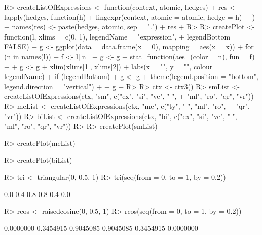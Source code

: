 \documentclass{article}\usepackage[]{graphicx}\usepackage[]{color}
\begin{document}
\begin{Schunk}
\begin{Sinput}
R> createListOfExpressions <- function(context, atomic, hedges) {
+      res <- lapply(hedges, function(h) {
+          lingexpr(context, atomic = atomic, hedge = h)
+      })
+      names(res) <- paste(hedges, atomic, sep = ".")
+      res
+  }
R> 
R> createPlot <- function(l, xlims = c(0, 1), legendName = "expression", 
+      legendBottom = FALSE) {
+      g <- ggplot(data = data.frame(x = 0), mapping = aes(x = x))
+      for (n in names(l)) {
+          f <- l[[n]]
+          g <- g + stat_function(aes_(color = n), fun = f)
+      }
+      g <- g + xlim(xlims[1], xlims[2]) + labs(x = "", y = "", colour = legendName)
+      if (legendBottom) {
+          g <- g + theme(legend.position = "bottom", legend.direction = "vertical")
+      }
+      g
+  }
R> 
R> ctx <- ctx3()
R> smList <- createListOfExpressions(ctx, "sm", c("ex", "si", "ve", "-", 
+      "ml", "ro", "qr", "vr"))
R> meList <- createListOfExpressions(ctx, "me", c("ty", "-", "ml", "ro", 
+      "qr", "vr"))
R> biList <- createListOfExpressions(ctx, "bi", c("ex", "si", "ve", "-", 
+      "ml", "ro", "qr", "vr"))
R> 
R> createPlot(smList)
\end{Sinput}
\end{Schunk}

\begin{Schunk}
\begin{Sinput}
R> createPlot(meList)
\end{Sinput}
\end{Schunk}

\begin{Schunk}
\begin{Sinput}
R> createPlot(biList)
\end{Sinput}
\end{Schunk}

\begin{Schunk}
% --begin: "triangular"
\begin{Sinput}
R> tri <- triangular(0, 0.5, 1)
R> tri(seq(from = 0, to = 1, by = 0.2))
\end{Sinput}
\begin{Soutput}
[1] 0.0 0.4 0.8 0.8 0.4 0.0
\end{Soutput}
\begin{Sinput}
R> rcos <- raisedcosine(0, 0.5, 1)
R> rcos(seq(from = 0, to = 1, by = 0.2))
\end{Sinput}
\begin{Soutput}
[1] 0.0000000 0.3454915 0.9045085 0.9045085 0.3454915 0.0000000
\end{Soutput}
%
% --end: "triangular"
\end{Schunk}
\end{document}
